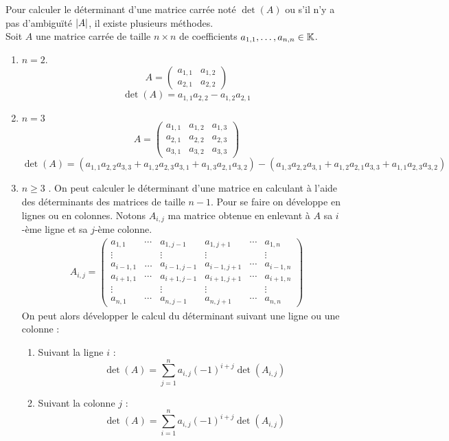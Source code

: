 Pour calculer le déterminant d'une matrice carrée noté $\det(A)$ ou s'il n'y a pas d'ambiguïté $\abs{A}$, il existe plusieurs méthodes.
	\\
    Soit $A$ une matrice carrée de taille $n \times n$ de coefficients $a_{1,1},\ldots,a_{n,n} \in \mathbb{K}$. 
    \begin{enumerate}
        \item $n = 2$. 
        \[ 
        A = 
        \begin{pmatrix}
            a_{1,1} & a_{1,2} \\
            a_{2,1} & a_{2,2}
        \end{pmatrix}
        \]
        \[ \det(A) = a_{1,1} a_{2,2} - a_{1,2} a_{2,1} \]
        \item $n = 3$
        \[
        A = 
        \begin{pmatrix}
            a_{1,1} & a_{1,2} & a_{1,3} \\
            a_{2,1} & a_{2,2} & a_{2,3} \\
            a_{3,1} & a_{3,2} & a_{3,3}
        \end{pmatrix}
        \]
        \[ \det(A) = (a_{1,1} a_{2,2} a_{3,3} + a_{1,2} a_{2,3} a_{3,1} + a_{1,3} a_{2,1} a_{3,2} ) - (a_{1,3} a_{2,2} a_{3,1} + a_{1,2} a_{2,1} a_{3,3} + a_{1,1} a_{2,3} a_{3,2}) \]
        \item $n \geq 3$ \cite{wikipedia_determinant}.
        On peut calculer le déterminant d'une matrice en calculant à l'aide des déterminants des matrices de taille $n-1$. Pour se faire on développe en lignes ou en colonnes.
        Notons $A_{i,j}$ ma matrice obtenue en enlevant à $A$ sa $i$-ème ligne et sa $j$-ème colonne.
        \begin{align*}
        	A_{i,j} = 
        	\begin{pmatrix}
        		a_{1,1} & \cdots & a_{1, j-1} & a_{1, j+1} & \cdots & a_{1,n} \\
        		\vdots & & \vdots & \vdots & & \vdots \\
        		a_{i-1, 1} & \ldots & a_{i-1, j-1} & a_{i-1, j+1} & \cdots & a_{i-1,n} \\
        		a_{i+1, 1} & \cdots & a_{i+1, j-1} & a_{i+1, j+1} & \cdots & a_{i+1, n} \\
        		\vdots & & \vdots & \vdots & & \vdots \\
        		a_{n,1} & \cdots & a_{n,j-1} & a_{n,j+1} & \cdots & a_{n,n}
        	\end{pmatrix}
        \end{align*}
        On peut alors développer le calcul du déterminant  suivant une ligne ou une colonne : 
        \begin{enumerate}
        	\item Suivant la ligne $i$ : 
        	\[ \det(A) = \sum_{j=1}^n a_{i,j} (-1)^{i+j} \det(A_{i,j}) \]
        	\item Suivant la colonne $j$ : 
        	\[ \det(A) = \sum_{i=1}^n a_{i,j} (-1)^{i+j} \det(A_{i,j}) \]
        \end{enumerate}
    \end{enumerate}

